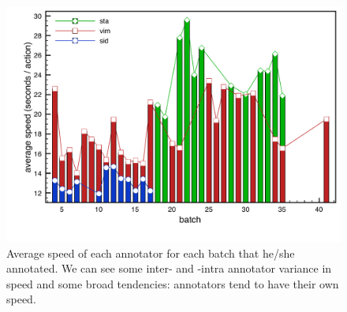 \begin{figure}[htbp]
   \centering
   \includegraphics[width=\textwidth]{images/speed/speed-anot} 
   \caption{Average speed of each annotator for each batch that he/she annotated. We can see some inter- and -intra annotator variance in speed and some broad tendencies: annotators tend to have their own speed.}
   \label{fig:speed}
\end{figure}

\todo {}
